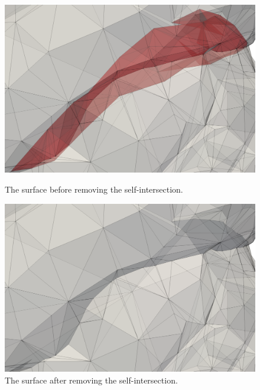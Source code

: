\documentclass[
11pt,%
tightenlines,%
twoside,%
onecolumn,%
nofloats,%
nobibnotes,%
nofootinbib,%
superscriptaddress,%
noshowpacs,%
centertags]%
{revtex4-2}
\begin{document}
\begin{figure}[h]
  \centering
  \begin{minipage}[h]{0.46\textwidth}
    \includegraphics[width=\textwidth]{pics/pic_self_intersection_on_2.png}
    \caption{The surface before removing the self-intersection.}\label{fig:pic_self_intersection_on_2}
  \end{minipage}
  \begin{minipage}[h]{0.46\textwidth}
    \includegraphics[width=\textwidth]{pics/pic_self_intersection_off_2.png}
    \caption{The surface after removing the self-intersection.}\label{fig:pic_self_intersection_off_2}
  \end{minipage}
\end{figure}
\end{document}
